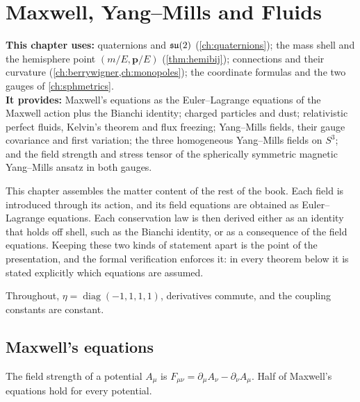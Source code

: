 \chapter{Maxwell, Yang--Mills and Fluids}
\label{ch:fields}

\begin{usesbox}
\textbf{This chapter uses:} quaternions and $\mathfrak{su}(2)$ (\cref{ch:quaternions}); the mass shell and the hemisphere point $(m/E,\mathbf p/E)$ (\cref{thm:hemibij}); connections and their curvature (\cref{ch:berrywigner,ch:monopoles}); the coordinate formulas and the two gauges of \cref{ch:sphmetrics}.\\
\textbf{It provides:} Maxwell's equations as the Euler--Lagrange equations of the Maxwell action plus the Bianchi identity; charged particles and dust; relativistic perfect fluids, Kelvin's theorem and flux freezing; Yang--Mills fields, their gauge covariance and first variation; the three homogeneous Yang--Mills fields on $S^3$; and the field strength and stress tensor of the spherically symmetric magnetic Yang--Mills ansatz in both gauges.
\end{usesbox}

This chapter assembles the matter content of the rest of the book. Each field is introduced through its action, and its field equations are obtained as Euler--Lagrange equations. Each conservation law is then derived either as an identity that holds off shell, such as the Bianchi identity, or as a consequence of the field equations. Keeping these two kinds of statement apart is the point of the presentation, and the formal verification enforces it: in every theorem below it is stated explicitly which equations are assumed.

Throughout, $\eta=\operatorname{diag}(-1,1,1,1)$, derivatives commute, and the coupling constants are constant.

\section{Maxwell's equations}

The field strength of a potential $A_\mu$ is $F_{\mu\nu}=\partial_\mu A_\nu-\partial_\nu A_\mu$. Half of Maxwell's equations hold for every potential.

